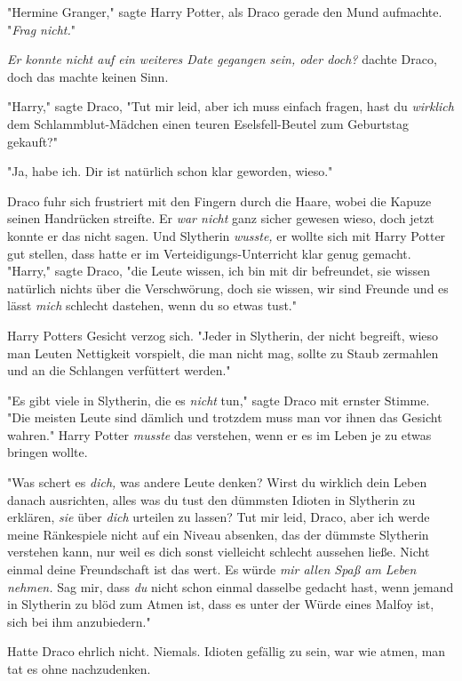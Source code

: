 {"Hermine Granger," sagte Harry Potter, als Draco gerade den Mund aufmachte. "\emph{Frag nicht.}"

\emph{Er konnte nicht auf ein weiteres Date gegangen sein, oder doch?} dachte Draco, doch das machte keinen Sinn.

"Harry," sagte Draco, "Tut mir leid, aber ich muss einfach fragen, hast du \emph{wirklich} dem Schlammblut-Mädchen einen teuren Eselsfell-Beutel zum Geburtstag gekauft?"

"Ja, habe ich. Dir ist natürlich schon klar geworden, wieso."

Draco fuhr sich frustriert mit den Fingern durch die Haare, wobei die Kapuze seinen Handrücken streifte. Er \emph{war nicht} ganz sicher gewesen wieso, doch jetzt konnte er das nicht sagen. Und Slytherin \emph{wusste,} er wollte sich mit Harry Potter gut stellen, dass hatte er im Verteidigungs-Unterricht klar genug gemacht. "Harry," sagte Draco, "die Leute wissen, ich bin mit dir befreundet, sie wissen natürlich nichts über die Verschwörung, doch sie wissen, wir sind Freunde und es lässt \emph{mich} schlecht dastehen, wenn du so etwas tust."

Harry Potters Gesicht verzog sich. "Jeder in Slytherin, der nicht begreift, wieso man Leuten Nettigkeit vorspielt, die man nicht mag, sollte zu Staub zermahlen und an die Schlangen verfüttert werden."

"Es gibt viele in Slytherin, die es \emph{nicht} tun," sagte Draco mit ernster Stimme. "Die meisten Leute sind dämlich und trotzdem muss man vor ihnen das Gesicht wahren." Harry Potter \emph{musste} das verstehen, wenn er es im Leben je zu etwas bringen wollte.

"Was schert es \emph{dich,} was andere Leute denken? Wirst du wirklich dein Leben danach ausrichten, alles was du tust den dümmsten Idioten in Slytherin zu erklären, \emph{sie} über \emph{dich} urteilen zu lassen? Tut mir leid, Draco, aber ich werde meine Ränkespiele nicht auf ein Niveau absenken, das der dümmste Slytherin verstehen kann, nur weil es dich sonst vielleicht schlecht aussehen ließe. Nicht einmal deine Freundschaft ist das wert. Es würde \emph{mir allen Spaß am Leben nehmen.} Sag mir, dass \emph{du} nicht schon einmal dasselbe gedacht hast, wenn jemand in Slytherin zu blöd zum Atmen ist, dass es unter der Würde eines Malfoy ist, sich bei ihm anzubiedern."

Hatte Draco ehrlich nicht. Niemals. Idioten gefällig zu sein, war wie atmen, man tat es ohne nachzudenken.

}
